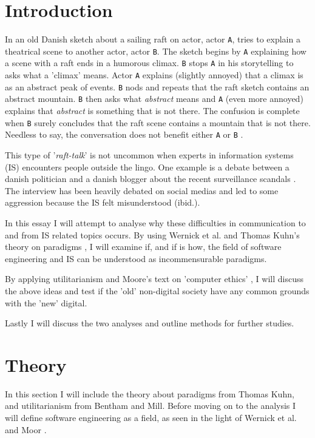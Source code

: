 \documentclass{article}
\begin{document}
\section{Introduction}
In an old Danish sketch about a sailing raft on actor, actor \texttt{A}, tries to explain a theatrical scene to another actor, actor \texttt{B}. The sketch begins by \texttt{A} explaining how a scene with a raft ends in a humorous climax. \texttt{B} stops \texttt{A} in his storytelling to asks what a 'climax' means. Actor \texttt{A} explains (slightly annoyed) that a climax is as an abstract peak of events. \texttt{B} nods and repeats that the raft sketch contains an abstract mountain. \texttt{B} then asks what \textit{abstract} means and \texttt{A} (even more annoyed) explains that \textit{abstract} is something that is not there. The confusion is complete when \texttt{B} surely concludes that the raft scene contains a mountain that is not there. Needless to say, the conversation does not benefit either \texttt{A} or \texttt{B} \citep{Raft:2014}.

This type of '\textit{raft-talk}' is not uncommon when experts in information systems (IS) encounters people outside the lingo. One example is a debate between a danish politician and a danish blogger about the recent surveillance scandals \citep{Bramsen:2014}. The interview has been heavily debated on social medias and led to some aggression because the IS felt misunderstood (ibid.).

In this essay I will attempt to analyse why these difficulties in communication to and from IS related topics occurs.
By using Wernick et al. and Thomas Kuhn's theory on paradigms \citep{Wernick:2004, Holm:2014}, I will examine if, and if is how, the field of software engineering and IS can be understood as incommensurable paradigms.

By applying utilitarianism and Moore's text on 'computer ethics' \citep{Moor:1985}, I will discuss the above ideas and test if the 'old' non-digital society have any common grounds with the 'new' digital.

Lastly I will discuss the two analyses and outline methods for further studies.

\section{Theory}
In this section I will include the theory about paradigms from Thomas Kuhn, and utilitarianism from Bentham and Mill. Before moving on to the analysis I will define software engineering as a field, as seen in the light of Wernick et al. and Moor \citep{Wernick:2004, Moor:1985}.
\end{document}
